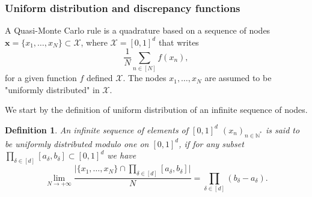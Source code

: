 \documentclass[twoside,11pt]{book}
\newtheorem{definition}{Definition}
\numberwithin{theorem}{chapter}
\numberwithin{definition}{chapter}
\numberwithin{proposition}{chapter}
\numberwithin{corollary}{chapter}
\numberwithin{example}{chapter}
\numberwithin{lemma}{chapter}
\numberwithin{assumption}{chapter}
\numberwithin{equation}{chapter}
\numberwithin{figure}{chapter}
\begin{document}









 
\subsubsection{Uniform distribution and discrepancy functions}

A Quasi-Monte Carlo rule is a quadrature based on a sequence of nodes $\bm{x} = \{ x_{1}, \dots, x_{N} \} \subset \mathcal{X}$, where $\mathcal{X} = [0,1]^{d}$ that writes
\begin{equation}
\frac{1}{N}\sum\limits_{n \in [N]} f(x_{n}),
\end{equation}
for a given function $f$ defined $\mathcal{X}$. The nodes $x_{1}, \dots, x_{N}$ are assumed to be "uniformly distributed" in $\mathcal{X}$. 

We start by the definition of uniform distribution of an infinite sequence of nodes.

\begin{definition}
An infinite sequence of elements of $[0,1]^{d}$ $(x_{n})_{n \in \mathbb{N}^{*}}$ is said to be \emph{uniformly distributed modulo one} on $[0,1]^{d}$, if for any subset $\prod\limits_{\delta \in [d]}[a_\delta,b_\delta] \subset [0,1]^{d}$ we have
\begin{equation}\label{eq:unif_dist_modulo_one}
\lim\limits_{N \rightarrow +\infty} \frac{\big|\{x_{1}, \dots, x_{N}\} \cap \prod_{\delta \in [d]}[a_\delta,b_\delta]\big|}{N} = \prod\limits_{\delta \in [d]} (b_{\delta}-a_{\delta}).
\end{equation}
\end{definition}
\end{document}
